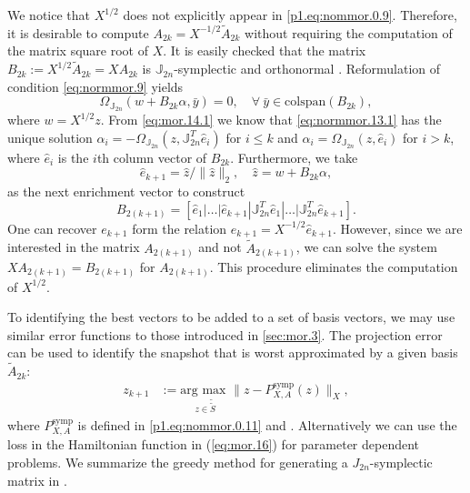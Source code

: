 We notice that $X^{1/2}$ does not explicitly appear in \eqref{p1.eq:nommor.0.9}. Therefore, it is desirable to compute $A_{2k} = X^{-1/2} \tilde A_{2k}$ without requiring the computation of the matrix square root of $X$. It is easily checked that the matrix $B_{2k}:=X^{1/2} \tilde A_{2k} = XA_{2k}$ is $\mathbb J_{2n}$-symplectic and orthonormal . Reformulation of condition \cref{eq:normmor.9} yields
\begin{equation} \label{eq:normmor.13.1}
	\Omega_{\mathbb J_{2n}}\left( w + B_{2k} \alpha, \bar y \right) = 0, \quad \forall~ \bar y \in \text{colspan}(B_{2k}),
\end{equation}
where $w = X^{1/2}z$. From \cref{eq:mor.14.1} we know that \cref{eq:normmor.13.1} has the unique solution $\alpha_i = - \Omega_{\mathbb J_{2n}}(z,\mathbb J_{2n}^T \hat e_i)$ for $i\leq k$ and $\alpha_i = \Omega_{\mathbb J_{2n}}(z,\hat e_i)$ for $i>k$, where $\hat e_i$ is the $i$th column vector of $B_{2k}$. Furthermore, we take 
\begin{equation}
	\hat e_{k+1} = \hat z / \| \hat z \|_2, \quad \hat z = w + B_{2k} \alpha,
\end{equation}
as the next enrichment vector to construct
\begin{equation}
	B_{2(k+1)} = [ \hat e_1 | \dots | \hat e_{k+1} | \mathbb J_{2n}^T \hat e_1 | \dots | \mathbb J_{2n}^T \hat e_{k+1} ].
\end{equation}
One can recover $e_{k+1}$ form the relation $e_{k+1} = X^{-1/2} \hat e_{k+1}$. However, since we are interested in the matrix $A_{2(k+1)}$ and not $\tilde A_{2(k+1)}$, we can solve the system $XA_{2(k+1)} = B_{2(k+1)}$ for $A_{2(k+1)}$. This procedure eliminates the computation of $X^{1/2}$.

To identifying the best vectors to be added to a set of basis vectors, we may use similar error functions to those introduced in \cref{sec:mor.3}. The projection error can be used to identify the snapshot that is worst approximated by a given basis $\tilde A_{2k}$:
\begin{equation} \label{eq:normmor.14}
\begin{aligned}
	z_{k+1} &:= \underset{z\in \tilde{\tilde{S}}}{\text{arg\ max } }\| z - P_{X,A}^{\text{symp}}(z) \|_X,
\end{aligned}
\end{equation}
where $P_{X,A}^{\text{symp}}$ is defined in \eqref{p1.eq:nommor.0.11} and . Alternatively we can use the loss in the Hamiltonian function in (\ref{eq:mor.16}) for parameter dependent problems. We summarize the greedy method for generating a $J_{2n}$-symplectic matrix in .

